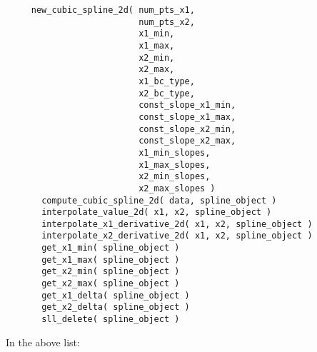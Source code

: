 \documentclass[]{report}   %
\begin{document}
\begin{verbatim}     
     new_cubic_spline_2d( num_pts_x1,  
                          num_pts_x2,  
                          x1_min,      
                          x1_max,     
                          x2_min,      
                          x2_max,     
                          x1_bc_type, 
                          x2_bc_type,  
                          const_slope_x1_min,
                          const_slope_x1_max,
                          const_slope_x2_min, 
                          const_slope_x2_max,
                          x1_min_slopes,
                          x1_max_slopes,
                          x2_min_slopes, 
                          x2_max_slopes )
       compute_cubic_spline_2d( data, spline_object )
       interpolate_value_2d( x1, x2, spline_object )
       interpolate_x1_derivative_2d( x1, x2, spline_object )
       interpolate_x2_derivative_2d( x1, x2, spline_object )      
       get_x1_min( spline_object )
       get_x1_max( spline_object )
       get_x2_min( spline_object )
       get_x2_max( spline_object )
       get_x1_delta( spline_object )
       get_x2_delta( spline_object )
       sll_delete( spline_object )             
\end{verbatim}

   
In the above list:
 
\end{document}
